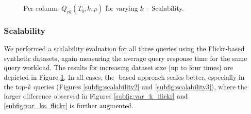 \begin{figure}[!tb]
 \quad
{}
\caption{Per column: $Q_{rk}(T_q, k, \rho)$ for varying $k$ -- Scalability.}
\label{fig:exp2_sim}
\end{figure}

\subsubsection{Scalability}
\label{subsec:scalability}
We performed a scalability evaluation for all three queries using the Flickr-based synthetic datasets, again measuring the average query response time for the same query workload. The results for increasing dataset size (up to four times) are depicted in Figure \ref{fig:exp2_sim}. In all cases, the \sbtsr-based approach scales better, especially in the top-$k$ queries (Figures \ref{subfig:scalability2} and \ref{subfig:scalability3}), where the larger difference observed in Figures \ref{subfig:var_k_flickr} and \ref{subfig:var_ks_flickr} is further augmented.